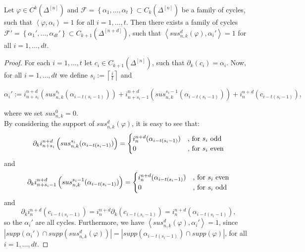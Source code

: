 \begin{lem}\label{lemma11}
Let \(\varphi\in C^k(\Delta^{[n]})\) and \(\mathcal{F}=\left\{\alpha_1,\ldots,\alpha_t\right\}\subset C_k(\Delta^{[n]})\) be a family of cycles, such that \(\left\langle\varphi,\alpha_i\right\rangle=1\) for all \(i=1,\ldots,t\). Then there exists a family of cycles \(\mathcal{F}'=\left\{\alpha_1',\ldots,\alpha_{dt}'\right\}\subset C_{k+1}(\Delta^{[n+d]})\), such that \(\left\langle sus_{n,k}^d(\varphi),\alpha_i'\right\rangle=1\) for all \(i=1,\ldots,dt\).
\begin{proof}
For each \(i=1,\ldots,t\) let \(c_i\in C_{k+1}(\Delta^{[n]})\), such that \(\partial_k(c_i)=\alpha_i\). Now, for all \(i=1,\ldots,dt\) we define \(s_i:=\left\lceil\frac{i}{t}\right\rceil\) and 
\begin{small}
\[
\alpha_i':=i_{n+s_i}^{n+d}\left(sus_{n,k}^{s_i}(\alpha_{i-t(s_i-1)})\right)+i_{n+s_i-1}^{n+d}\left(sus_{n,k}^{s_i-1}(\alpha_{i-t(s_i-1)})\right)+i_n^{n+d}\left(c_{i-t(s_i-1)}\right),
\]
\end{small}
where we set \(sus_{n,k}^0=0\).\\
By considering the support of \(sus_{n,k}^d(\varphi)\), it is easy to see that:
\begin{equation}
\partial_ki_{n+s_i}^{n+d}\left(sus_{n,k}^{s_i}(\alpha_{i-t(s_i-1)})\right)=
\begin{cases}
i_n^{n+d}(\alpha_{i-t(s_i-1)})&\text{, for }s_i\text{ odd}\notag\\
0&\text{, for }s_i\text{ even}\notag
\end{cases}
\end{equation}
and
\begin{equation}
\partial_ki_{n+s_i-1}^{n+d}\left(sus_{n,k}^{s_i-1}(\alpha_{i-t(s_i-1)})\right)=
\begin{cases}
i_n^{n+d}(\alpha_{i-t(s_i-1)})&\text{, for }s_i\text{ even}\notag\\
0&\text{, for }s_i\text{ odd}\notag
\end{cases}
\end{equation}
and
\[
\partial_ki_n^{n+d}(c_{i-t(s_i-1)})=i_n^{n+d}\partial_k(c_{i-t(s_i-1)})=i_n^{n+d}(\alpha_{i-t(s_i-1)}),
\]
so the \(\alpha_i'\) are all cycles. Furthermore, we have \(\left\langle sus_{n,k}^d(\varphi),\alpha_i'\right\rangle=1\), since \(|supp(\alpha_i')\cap supp(sus_{n,k}^d(\varphi))|=|supp(\alpha_{i-t(s_i-1)})\cap supp(\varphi)|\), for all \(i=1,\ldots,dt\).
\end{proof}
\end{lem}

